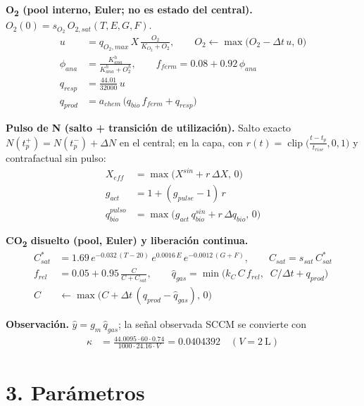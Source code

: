 \documentclass[11pt,a4paper]{article}
\begin{document}
\textbf{O\textsubscript{2} (pool interno, Euler; no es estado del central).}
$O_2(0)=s_{O_2}\,O_{2,sat}(T,E,G,F)$.
\begin{align}
u &= q_{O_2,max}\,X\,\frac{O_2}{K_{O_2}+O_2}, \qquad
O_2 \leftarrow \max\!\big(O_2-\Delta t\,u,\,0\big) \tag{C4}\\
\phi_{ana} &= \frac{K_{ana}^{h}}{K_{ana}^{h}+O_2^{h}}, \qquad
f_{ferm} = 0.08+0.92\,\phi_{ana} \tag{C5}\\
q_{resp} &= \frac{44.01}{32000}\,u \tag{C6}\\
q_{prod} &= a_{chem}\,\big(q_{bio}\,f_{ferm} + q_{resp}\big) \tag{C7}
\end{align}

\textbf{Pulso de N (salto + transición de utilización).} Salto exacto
$N(t_p^+)=N(t_p^-)+\Delta N$ en el central; en la capa, con
$r(t)=\operatorname{clip}\!\big(\frac{t-t_p}{t_{rise}},0,1\big)$ y contrafactual sin pulso:
\begin{align}
X_{eff} &= \max\!\big(X^{sin} + r\,\Delta X,\,0\big) \tag{C8}\\
g_{act} &= 1+(g_{pulse}-1)\,r \tag{C9}\\
q_{bio}^{pulso} &= \max\!\big(g_{act}\,q_{bio}^{sin} + r\,\Delta q_{bio},\,0\big) \tag{C10}
\end{align}

\textbf{CO\textsubscript{2} disuelto (pool, Euler) y liberación continua.}
\begin{align}
C^*_{sat} &= 1.69\,e^{-0.032\,(T-20)}\,e^{0.0016\,E}\,e^{-0.0012\,(G+F)}, \qquad
C_{sat} = s_{sat}\,C^*_{sat} \tag{C11}\\
f_{rel} &= 0.05+0.95\,\frac{C}{C+C_{sat}}, \qquad
\hat q_{gas} = \min\!\big(k_C\,C\,f_{rel},\;\; C/\Delta t + q_{prod}\big) \tag{C12}\\
C &\leftarrow \max\!\big(C+\Delta t\,(q_{prod}-\hat q_{gas}),\,0\big) \tag{C13}
\end{align}

\textbf{Observación.} $\hat y = g_{m}\,\hat q_{gas}$; la señal observada SCCM se convierte con
\begin{align}
\kappa &= \frac{44.0095\cdot 60\cdot 0.74}{1000\cdot 24.16\cdot V} = 0.0404392 \quad (V=2~\mathrm{L})
\tag{C14}
\end{align}

\section*{3. Parámetros}
\end{document}
